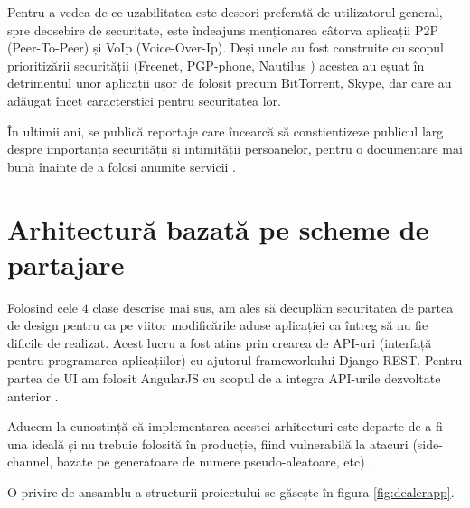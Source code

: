 \documentclass[oneside, 12pt]{book}
\begin{document}
Pentru a vedea de ce uzabilitatea este deseori preferată de utilizatorul general, spre deosebire de securitate, este îndeajuns menționarea câtorva aplicații P2P (Peer-To-Peer) și VoIp (Voice-Over-Ip). Deși unele au fost construite cu scopul prioritizării securității (Freenet, PGP-phone, Nautilus \cite{website:freenet, website:pgp-phone, website:nautilus}) acestea au eșuat în detrimentul unor aplicații ușor de folosit precum BitTorrent, Skype, dar care au adăugat încet caracterstici pentru securitatea lor.

În ultimii ani, se publică reportaje care încearcă să conștientizeze publicul larg despre importanța securității și intimității persoanelor, pentru o documentare mai bună înainte de a folosi anumite servicii \cite{greenwald:2013nsa, greenwald:2013edward}.
\section{Arhitectură bazată pe scheme de partajare}

Folosind cele $4$ clase descrise mai sus, am ales să decuplăm securitatea de partea de design pentru ca pe viitor modificările aduse aplicației ca întreg să nu fie dificile de realizat. Acest lucru a fost atins prin crearea de API-uri (interfață pentru programarea aplicațiilor) cu ajutorul frameworkului Django REST. Pentru partea de UI am folosit AngularJS cu scopul de a integra API-urile dezvoltate anterior \cite{website:angularjs, website:django-rest}.

Aducem la cunoștință că implementarea acestei arhitecturi este departe de a fi una ideală și nu trebuie folosită în producție, fiind vulnerabilă la atacuri (side-channel, bazate pe generatoare de numere pseudo-aleatoare, etc) \cite{kocher:1996timing, gutterman:2006analysis}.

O privire de ansamblu a structurii proiectului se găsește în figura \ref{fig:dealerapp}.
\end{document}
